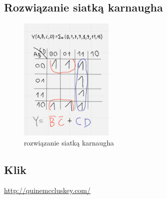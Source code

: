 \newpage

\subsection{Rozwiązanie siatką karnaugha}

\begin{figure}[h!]
    \centering
    \includegraphics[width=0.4\textwidth]{images/qmc/qmc_k.png}
    \caption{rozwiązanie siatką karnaugha}
    \label{fig:my_label}
\end{figure}

\subsection{Klik}

\url{http://quinemccluskey.com/}